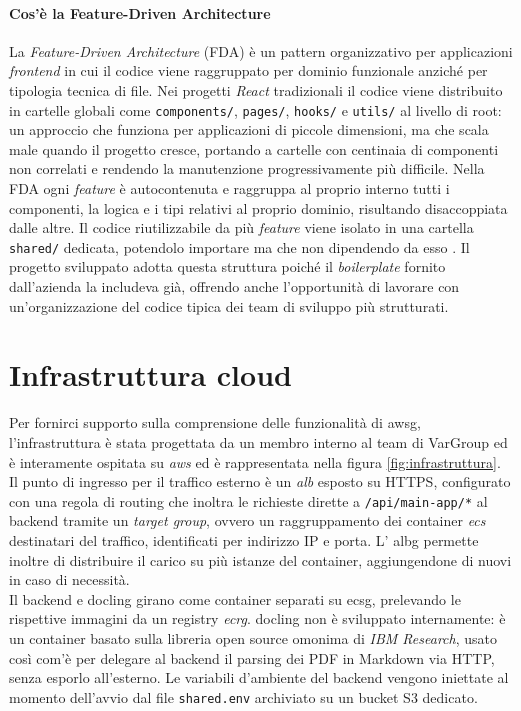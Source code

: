 \paragraph{Cos'è la Feature-Driven Architecture}
La \emph{Feature-Driven Architecture} (FDA) è un pattern organizzativo per applicazioni \emph{frontend} in cui il codice viene raggruppato per dominio funzionale anziché per tipologia tecnica di file. Nei progetti \emph{React} tradizionali il codice viene distribuito in cartelle globali come \texttt{components/}, \texttt{pages/}, \texttt{hooks/} e \texttt{utils/} al livello di root: un approccio che funziona per applicazioni di piccole dimensioni, ma che scala male quando il progetto cresce, portando a cartelle con centinaia di componenti non correlati e rendendo la manutenzione progressivamente più difficile. Nella FDA ogni \emph{feature} è autocontenuta e raggruppa al proprio interno tutti i componenti, la logica e i tipi relativi al proprio dominio, risultando disaccoppiata dalle altre. Il codice riutilizzabile da più \emph{feature} viene isolato in una cartella \texttt{shared/} dedicata, potendolo importare ma che non dipendendo da esso \cite{site:FDA}. Il progetto sviluppato adotta questa struttura poiché il \emph{boilerplate} fornito dall'azienda la includeva già, offrendo anche l'opportunità di lavorare con un'organizzazione del codice tipica dei team di sviluppo più strutturati.

\section{Infrastruttura cloud}
Per fornirci supporto sulla comprensione delle funzionalità di \gls{awsg}, l'infrastruttura è stata progettata da un membro interno al team di VarGroup ed è interamente ospitata su {\emph{\gls{aws}}\glsfirstoccur} ed è rappresentata nella figura \ref{fig:infrastruttura}. Il punto di ingresso per il traffico esterno è un {\emph{\gls{alb}}\glsfirstoccur} esposto su HTTPS, configurato con una regola di routing che inoltra le richieste dirette a \texttt{/api/main-app/*} al backend tramite un \emph{target group}, ovvero un raggruppamento dei container {\emph{\gls{ecs}}\glsfirstoccur} destinatari del traffico, identificati per indirizzo IP e porta. L' \gls{albg} permette inoltre di distribuire il carico su più istanze del container, aggiungendone di nuovi in caso di necessità.\\

Il backend e \gls{docling} girano come container separati su \gls{ecsg}, prelevando le rispettive immagini da un registry {\emph{\gls{ecrg}}\glsfirstoccur}. \gls{docling} non è sviluppato internamente: è un container basato sulla libreria open source omonima di \emph{IBM Research}, usato così com'è per delegare al backend il parsing dei PDF in Markdown via HTTP, senza esporlo all'esterno. Le variabili d'ambiente del backend vengono iniettate al momento dell'avvio dal file \texttt{shared.env} archiviato su un bucket S3 dedicato.

